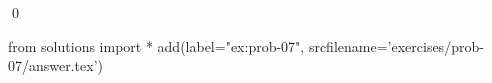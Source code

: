 
\begin{ex} 
  \label{ex:prob-07}
  
  \qed
\end{ex} 
\begin{python0}
from solutions import *
add(label="ex:prob-07",
    srcfilename='exercises/prob-07/answer.tex') 
\end{python0}

